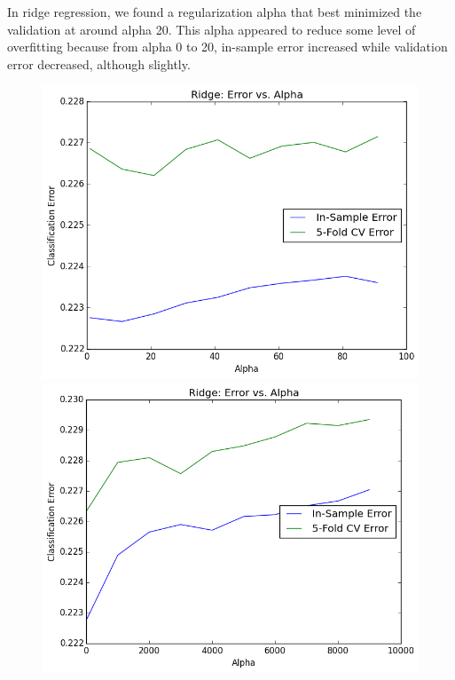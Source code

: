 \begin{itemize}
\begin{itemize}
\begin{figure}[H]
\end{figure}
In ridge regression, we found a regularization alpha that best minimized the validation at around alpha 20. This alpha appeared to reduce some level of overfitting because from alpha 0 to 20, in-sample error increased  while validation error decreased, although slightly.
\begin{figure}[H]
\centering
\includegraphics[scale=0.25]{ridge-vs-alpha}
\includegraphics[scale=0.25]{ridge-vs-alpha3}

\end{figure}
\end{itemize}
\end{itemize}
